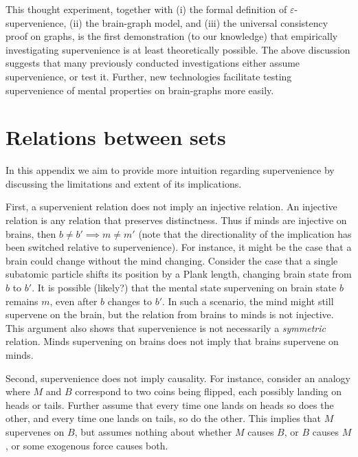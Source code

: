 \documentclass{article}
\begin{document}

This thought experiment, together with (i) the formal definition of $\varepsilon$-supervenience, (ii) the brain-graph model, and (iii) the universal consistency proof on graphs, is the first demonstration (to our knowledge) that empirically investigating supervenience is at least theoretically possible. The above discussion suggests that many previously conducted investigations either assume supervenience, or test it.  Further, new technologies facilitate testing supervenience of mental properties on brain-graphs more easily.


\clearpage
\appendix



\section{Relations between sets} %
\label{sec:relations}

In this appendix we aim to provide more intuition regarding supervenience by discussing the limitations and extent of its implications. 


First, a supervenient relation does not imply an injective relation.  An injective relation is any relation that preserves distinctness.  Thus if minds are injective on brains, then $b\neq b' \implies m \neq m'$ (note that the directionality of the implication has been switched relative to supervenience). For instance, it might be the case that a brain could change without the mind changing.  Consider the case that a single subatomic particle shifts its position by a Plank length, changing brain state from $b$ to $b'$.  It is possible (likely?) that the mental state supervening on brain state $b$ remains $m$, even after $b$ changes to $b'$.  In such a scenario, the mind might still supervene on the brain, but the relation from brains to minds is not injective. This argument also shows that supervenience is not necessarily a \emph{symmetric} relation.  Minds supervening on brains does not imply that brains supervene on minds.  


Second,  supervenience does not imply causality. %
For instance, consider an analogy where $M$ and $B$ correspond to two coins being flipped, each possibly landing on heads or tails.  Further assume that every time one lands on heads so does the other, and every time one lands on tails, so do the other. This implies that $M$ supervenes on $B$, but assumes nothing about whether $M$ causes $B$, or $B$ causes $M$, or some exogenous force causes both.  
\end{document}
